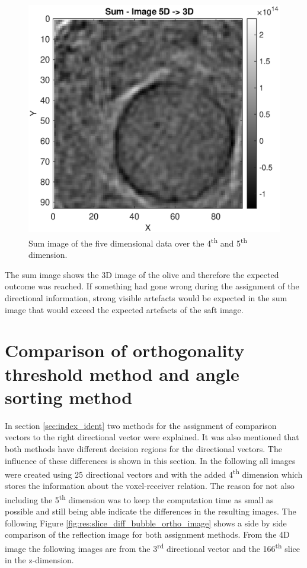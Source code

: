 \begin{figure}[H]
    \centering
    \includegraphics[width=0.69\linewidth]{Graphics/sum_image_35_vec_to_show_that_assign_works.eps}
    \caption{Sum image of the five dimensional data over the 4\textsuperscript{th} and 5\textsuperscript{th} dimension. }
    \label{fig:res:sum_image_35_vec_to_show_that_assign_works}
\end{figure}

The sum image shows the 3D image of the olive and therefore the expected outcome was reached. If something had gone wrong during the assignment of the directional information, strong visible artefacts would be expected in the sum image that would exceed the expected artefacts of the \ac{saft} image.



\section{Comparison of orthogonality threshold method and angle sorting method}

In section \ref{sec:index_ident} two methods for the assignment of comparison vectors to the right directional vector were explained. It was also mentioned that both methods have different decision regions for the directional vectors. The influence of these differences is shown in this section. In the following all images were created using 25 directional vectors and with the added 4\textsuperscript{th} dimension which stores the information about the voxel-receiver relation. The reason for not also including the 5\textsuperscript{th} dimension was to keep the computation time as small as possible and still being able indicate the differences in the resulting images. The following Figure \ref{fig:res:slice_diff_bubble_ortho_image} shows a side by side comparison of the reflection image for both assignment methods. From the 4D image the following images are from the 3\textsuperscript{rd} directional vector and the 166\textsuperscript{th} slice in the z-dimension.


